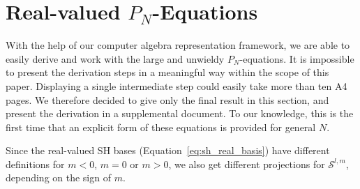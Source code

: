 \section{Real-valued $P_N$-Equations}
\label{sec:real_valued_pn_eq}

With the help of our computer algebra representation framework, we are able to easily derive and work with the large and unwieldy $P_N$-equations. It is impossible to present the derivation steps in a meaningful way within the scope of this paper. Displaying a single intermediate step could easily take more than ten A4 pages. We therefore decided to give only the final result in this section, and present the derivation in a supplemental document. To our knowledge, this is the first time that an explicit form of these equations is provided for general $N$. 

Since the real-valued SH bases (Equation~\ref{eq:sh_real_basis}) have different definitions for $m<0$, $m=0$ or $m>0$,  we also get different projections for $\mathcal{S}^{l,m}$, depending on the sign of $m$.


